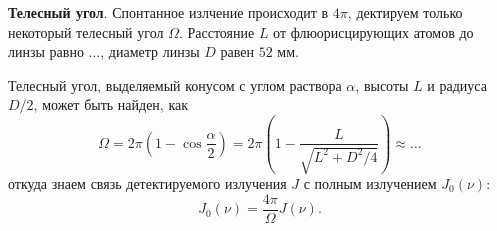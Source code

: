\textbf{Телесный угол}. Спонтанное излчение происходит в $4 \pi$, дектируем только некоторый телесный угол $\Omega$. 
Расстояние $L$ от флюорисцирующих атомов до линзы равно $\ldots$, диаметр линзы $D$ равен $52$ мм.

Телесный угол, выделяемый конусом с углом раствора $\alpha$, высоты $L$ и радиуса $D/2$, может быть найден, как
\begin{equation*}
	\Omega = 2 \pi \left(1 - \cos \frac{\alpha}{2}\right) = 2 \pi \left(1 - \frac{L}{\sqrt{L^2 + D^2/4}}\right) \approx	\ldots
\end{equation*}
откуда знаем связь детектируемого излучения $J$ с полным излучением $J_0(\nu)$:
\begin{equation*}
	J_0 (\nu) = \frac{4 \pi}{\Omega} J(\nu).
\end{equation*}
